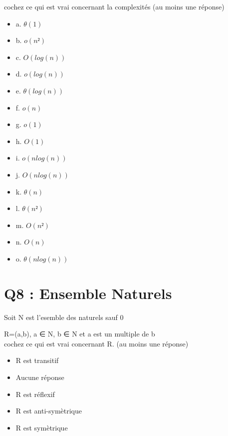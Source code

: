 cochez ce qui est vrai concernant la complexités (au moins une réponse)\\
\begin{itemize}[label=$\square$]
\item {a. $\theta(1)$}
\item {b. $o(n²)$}
\item {c. $O(log(n))$}
\item {d. $o(log(n))$}
\item {e. $\theta(log(n))$}
\item {f. $o(n)$}
\item {g. $o(1)$}
\item {h. $O(1)$}
\item {i. $o(n log(n))$}
\item {j. $O(n log(n))$}
\item {k. $\theta(n)$}
\item {l. $\theta(n²)$}
\item {m. $O(n²)$}
\item {n. $O(n)$}
\item {o. $\theta(n log(n))$}
\end{itemize}

\newpage
\section{Q8 : Ensemble Naturels}
\vspace{5mm} %

Soit N est l’esemble des naturels sauf 0

  R={(a,b), a ∈ N, b ∈ N et a est un multiple de b }\\


cochez ce qui est vrai concernant R. (au moins une réponse)\\
\begin{itemize}[label=$\square$]
\item R est transitif
\item Aucune réponse
\item R est réflexif
\item R est anti-symètrique
\item R est symètrique
\end{itemize}
